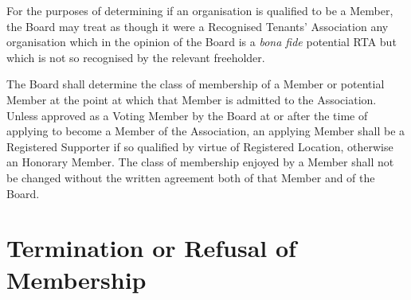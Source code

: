 \documentclass[10pt]{mk-articles-of-association}
\newcommand{\EC}[0]{Board}
\newcommand{\Exec}[0]{\EC{} }
\newcommand{\RTA}[0]{Recognised Tenants' Association}
\begin{document}
\begin{constenum}
  \item For the purposes of determining if an organisation is
    qualified to be a Member, the \Exec may treat as though it were a
    \RTA{} any organisation which in the opinion of the \Exec is a
    \textit{bona fide} potential RTA but which is not so recognised by
    the relevant freeholder.


  \item The \Exec shall determine the class of membership of a Member
    or potential Member at the point at which that Member is admitted
    to the Association. Unless approved as a Voting Member by the
    \Exec at or after the time of applying to become a Member of the
    Association, an applying Member shall be a Registered Supporter if
    so qualified by virtue of Registered Location, otherwise an
    Honorary Member.  The class of membership enjoyed by a Member
    shall not be changed without the written agreement both of that
    Member and of the \EC{}.

\end{constenum}



\section{Termination or Refusal of Membership}
\end{document}
